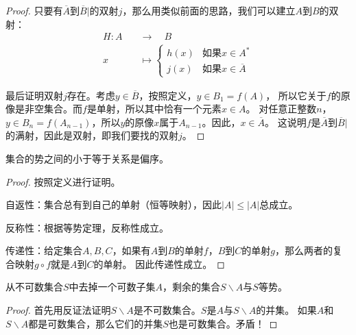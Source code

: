 \documentclass[12pt,UTF8]{ctexbook}
\begin{document}
\begin{appendix}
\begin{proof}
    只要有$\overline{A}$到$\overline{B}|$的双射$j$，那么用类似前面的思路，我们可以建立$A$到$B$的双射：
    \begin{align*}
        H : A \quad&\rightarrow \quad B  \\
        x \quad&\mapsto \left\{ \begin{array}{ll}
            h(x) & \mbox{如果} x\in A^*  \\
            j(x) & \mbox{如果} x\in \overline{A}
        \end{array} \right.
    \end{align*}

    最后证明双射$j$存在。考虑$y \in \overline{B}$，按照定义，$y\in B_1 = f(A)$，
    所以它关于$f$的原像是非空集合。而$f$是单射，所以其中恰有一个元素$x\in A$。
    对任意正整数$n$，$y\in B_n = f(A_{n-1})$，所以$y$的原像$x$属于$A_{n-1}$。因此，$x\in \overline{A}$。
    这说明$f$是$\overline{A}$到$\overline{B}|$的满射，因此是双射，即我们要找的双射$j$。

\end{proof}

\begin{tm}
    集合的势之间的小于等于关系是偏序。
\end{tm}

\begin{proof}
    按照定义进行证明。
    
    自返性：集合总有到自己的单射（恒等映射），因此$|A| \leqslant |A|$总成立。

    反称性：根据等势定理，反称性成立。

    传递性：给定集合$A,B,C$，如果有$A$到$B$的单射$f$，$B$到$C$的单射$g$，那么两者的复合映射$g\circ f$就是$A$到$C$的单射。
    因此传递性成立。

\end{proof}

\begin{tm}\label{tm:a-1-15}
    从不可数集合$S$中去掉一个可数子集$A$，剩余的集合$S\backslash A$与$S$等势。
\end{tm}

\begin{proof}
    首先用反证法证明$S\backslash A$是不可数集合。$S$是$A$与$S\backslash A$的并集。
    如果$A$和$S\backslash A$都是可数集合，那么它们的并集$S$也是可数集合。矛盾！


\end{proof}
\end{appendix}
\end{document}
